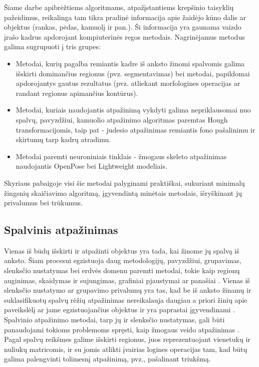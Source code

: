 \documentclass{VUMIFPSbakalaurinis}
\begin{document}
Šiame darbe apibrėžtiems algoritmams, atpažįstantiems krepšinio taisyklių pažeidimus, reikalinga tam tikra pradinė informacija apie žaidėjo kūno dalis ar objektus (rankas, pėdas, kamuolį ir pan.). Ši informacija yra gaunama vaizdo įrašo kadrus apdorojant kompiuterinės regos metodais. 
Nagrinėjamus metodus galima sugrupuoti į tris grupes: 

\begin{itemize}
	\item Metodai, kurių pagalba remiantis kadre iš anksto žinomi spalvomis galima išskirti dominančius regionus (pvz. segmentavimas) bei metodai, papildomai apdorojantys gautus rezultatus (pvz. atliekant morfologines operacijas ar randant regionus apimančius kontūrus).
	\item Metodai, kuriais naudojantis atpažinimą vykdyti galima nepriklausomai nuo spalvų, pavyzdžiui, kamuolio atpažinimo algoritmas paremtas Hough transformacijomis, taip pat - judesio atpažinimas remiantis fono pašalinimu ir skirtumų tarp kadrų atradimu.
	\item Metodai paremti neuroniniais tinklais - žmogaus skeleto atpažinimas naudojantis OpenPose bei Lightweight modeliais. 
\end{itemize}

Skyriaus pabaigoje visi šie metodai palyginami praktiškai, sukuriant minimalų žingsnių skaičiavimo algoritmą, įgyvendintą minėtais metodais, išryškinant jų privalumus bei trūkumus. 

\subsection{Spalvinis atpažinimas}
Vienas iš būdų išskirti ir atpažinti objektus yra tada, kai žinome jų spalvą iš anksto. Šiam procesui egzistuoja daug metodologijų, pavyzdžiui, grupavimas, slenksčio nustatymas bei erdvės domenu paremti metodai, tokie kaip regionų auginimas, skaidymas ir sujungimas, grafiniai pjaustymai ar panašiai \cite{segmentation_trends}. Vienas iš slenksčio nustatymo ar grupavimo privalumų yra tas, kad be iš anksto žinamų ir suklasifikuotų spalvų rėžių atpažinimas nereikalauja daugiau a priori žinių apie paveikslėlį ar jame egzistuojančius objektus ir yra paprastai įgyvendinami \cite{segmentation_trends}. Spalvinio atpažinimo metodai, tarp jų ir slenksčio nustatymas, gali būti panaudojami tokioms problemoms spręsti, kaip žmogaus veido atpažinimas \cite{WANG20011983}. Pagal spalvų reikšmes galime išskirti regionus, juos reprezentuojant vienetukų ir nuliukų matricomis, ir su jomis atlikti įvairias logines operacijas tam, kad būtų galima palengvinti tolimesnį atpažinimą, pvz., pašalinant triukšmą. 
\end{document}
